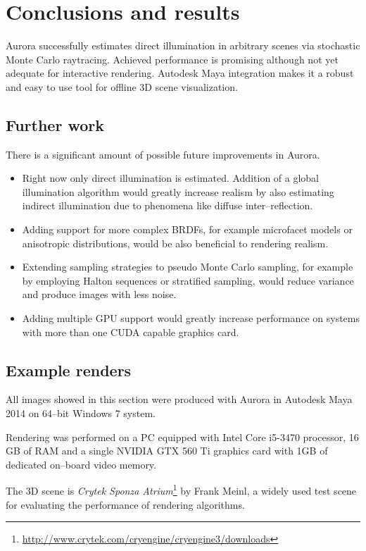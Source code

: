 \chapter{Conclusions and results}
\label{ch:results}

Aurora successfully estimates direct illumination in arbitrary scenes via stochastic Monte Carlo raytracing. Achieved performance is promising although not yet adequate for interactive rendering. Autodesk Maya integration makes it a robust and easy to use tool for offline 3D scene visualization.

\section{Further work}
There is a significant amount of possible future improvements in Aurora.
\begin{itemize}
\item Right now only direct illumination is estimated. Addition of a global illumination algorithm would greatly increase realism by also estimating indirect illumination due to phenomena like diffuse inter--reflection.
\item Adding support for more complex BRDFs, for example microfacet models or anisotropic distributions, would be also beneficial to rendering realism.
\item Extending sampling strategies to pseudo Monte Carlo sampling, for example by employing Halton sequences or stratified sampling, would reduce variance and produce images with less noise.
\item Adding multiple GPU support would greatly increase performance on systems with more than one CUDA capable graphics card.
\end{itemize}
\vfill

\section{Example renders}
All images showed in this section were produced with Aurora in Autodesk Maya 2014 on 64--bit Windows 7 system. 

Rendering was performed on a PC equipped with Intel Core i5-3470 processor, 16 GB of RAM and a single NVIDIA GTX 560 Ti graphics card with 1GB of dedicated on--board video memory.

The 3D scene is \emph{Crytek Sponza Atrium}\footnote{\url{http://www.crytek.com/cryengine/cryengine3/downloads}} by Frank Meinl, a widely used test scene for evaluating the performance of rendering algorithms.

